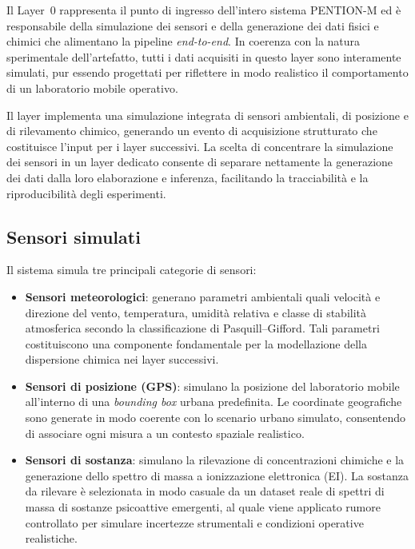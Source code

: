 Il Layer~0 rappresenta il punto di ingresso dell’intero sistema \textsc{PENTION-M} ed è responsabile della simulazione dei sensori e della generazione dei dati fisici e chimici che alimentano la pipeline \textit{end-to-end}.
In coerenza con la natura sperimentale dell’artefatto, tutti i dati acquisiti in questo layer sono interamente simulati, pur essendo progettati per riflettere in modo realistico il comportamento di un laboratorio mobile operativo.

Il layer implementa una simulazione integrata di sensori ambientali, di posizione e di rilevamento chimico, generando un evento di acquisizione strutturato che costituisce l’input per i layer successivi.
La scelta di concentrare la simulazione dei sensori in un layer dedicato consente di separare nettamente la generazione dei dati dalla loro elaborazione e inferenza, facilitando la tracciabilità e la riproducibilità degli esperimenti.

\subsection*{Sensori simulati}

Il sistema simula tre principali categorie di sensori:

\begin{itemize}
	\item \textbf{Sensori meteorologici}: generano parametri ambientali quali velocità e direzione del vento, temperatura, umidità relativa e classe di stabilità atmosferica secondo la classificazione di Pasquill--Gifford.
	      Tali parametri costituiscono una componente fondamentale per la modellazione della dispersione chimica nei layer successivi.

	\item \textbf{Sensori di posizione (GPS)}: simulano la posizione del laboratorio mobile all’interno di una \textit{bounding box} urbana predefinita.
	      Le coordinate geografiche sono generate in modo coerente con lo scenario urbano simulato, consentendo di associare ogni misura a un contesto spaziale realistico.

	\item \textbf{Sensori di sostanza}: simulano la rilevazione di concentrazioni chimiche e la generazione dello spettro di massa a ionizzazione elettronica (EI).
	      La sostanza da rilevare è selezionata in modo casuale da un dataset reale di spettri di massa di sostanze psicoattive emergenti, al quale viene applicato rumore controllato per simulare incertezze strumentali e condizioni operative realistiche.
\end{itemize}

